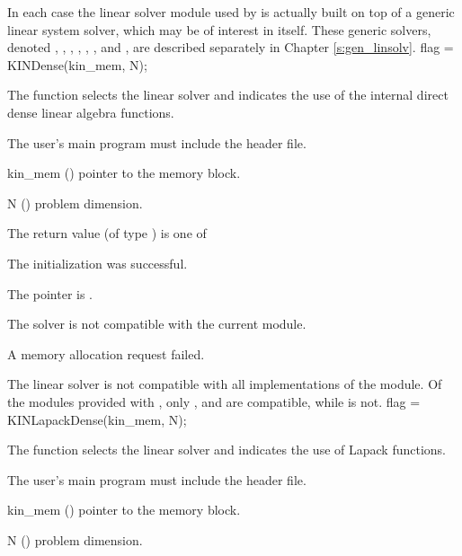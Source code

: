 In each case the linear solver module used by {\kinsol} is actually
built on top of a generic linear system solver, which may be of
interest in itself. These generic solvers, denoted {\dense}, {\band},
{\klu}, {\superlumt}, {\spgmr}, {\spbcg}, and {\sptfqmr},
are described separately in Chapter \ref{s:gen_linsolv}.
{
  flag = KINDense(kin\_mem, N);
}
{
  The function  selects the {\kindense} linear solver and indicates
  the use of the internal direct dense linear algebra functions. 

  The user's main program must include the  header file.
}
{
  \begin{args}
  \item[kin\_mem] ()
    pointer to the {\kinsol} memory block.
  \item[N] ()
    problem dimension.
  \end{args}
}
{
  The return value  (of type ) is one of
  \begin{args}
  \item[\Id{KINDLS\_SUCCESS}] 
    The {\kindense} initialization was successful.
  \item[\Id{KINDLS\_MEM\_NULL}]
    The  pointer is .
  \item[\Id{KINDLS\_ILL\_INPUT}]
    The {\kindense} solver is not compatible with the current {\nvector} module.
  \item[\Id{KINDLS\_MEM\_FAIL}]
    A memory allocation request failed.
  \end{args}
}
{
  The {\kindense} linear solver is not compatible with all
  implementations of the {\nvector} module.  Of the {\nvector} modules
  provided with {\sundials}, only {\nvecs}, {\nvecopenmp} and
  {\nvecpthreads} are compatible, while {\nvecp} is not.
}
{
  flag = KINLapackDense(kin\_mem, N);
}
{
  The function  selects the {\kindense} linear solver and 
  indicates the use of Lapack functions. 

  The user's main program must include the  header file.
}
{
  \begin{args}
  \item[kin\_mem] ()
    pointer to the {\kinsol} memory block.
  \item[N] ()
    problem dimension.
  \end{args}
}
